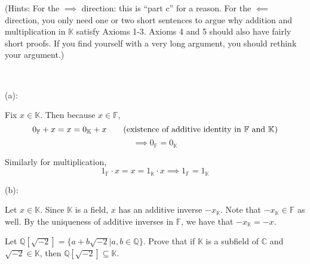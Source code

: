 \documentclass{article}
\theoremstyle{plain} %
\numberwithin{thm}{section} %
\theoremstyle{definition}
\begin{document}
\begin{question}{4}
\begin{enumerate}
            (Hints: For the \( \implies \) direction: this is ``part c'' for a reason. For the \( \impliedby \) direction, you only need one or two short sentences to argue why addition and multiplication in \( \mathbb{K} \) satisfy Axioms 1-3. Axioms 4 and 5 should also have fairly short proofs. If you find yourself with a very long argument, you should rethink your argument.)
            
        \end{enumerate}
        \tcblower
        \ 

        (a):

        Fix \(x \in \mathbb{K}\). Then because \(x \in \mathbb{F}\),
        \[
            0_{\mathbb{F}} + x = x = 0_{\mathbb{K}} + x \tag{existence of additive identity in \( \mathbb{F}\) and \(\mathbb{K}\)}
        \]
        \[
            \implies 0_{\mathbb{F}} = 0_{\mathbb{K}} \tag{by cancellation}
        \]

        Similarly for multiplication,
        \[
            1_{\mathbb{F}} \cdot x = x = 1_{\mathbb{K}} \cdot x \implies 1_{\mathbb{F}} = 1_{\mathbb{K}}
        \]

        \medskip

        (b):

        Let \(x \in \mathbb{K}\). Since \(\mathbb{K}\) is a field, \(x\) has an additive inverse \(-x_{\mathbb{K}}\). Note that \(-x_{\mathbb{K}} \in \mathbb{F}\) as well. By the uniqueness of additive inverses in \(\mathbb{F}\), we have that \(-x_{\mathbb{K}} = -x\).
    \end{question}
    \newpage
    \begin{question}{5}
        Let \(\mathbb{Q}[\sqrt{-2}] = \{a + b\sqrt{-2} | a,b \in \mathbb{Q}\}\). Prove that if \(\mathbb{K}\) is a subfield of \(\mathbb{C}\) and \(\sqrt{-2} \in \mathbb{K}\), then \(\mathbb{Q}[\sqrt{-2}] \subseteq \mathbb{K}\).
    \end{question}
    \newpage
\end{document}
